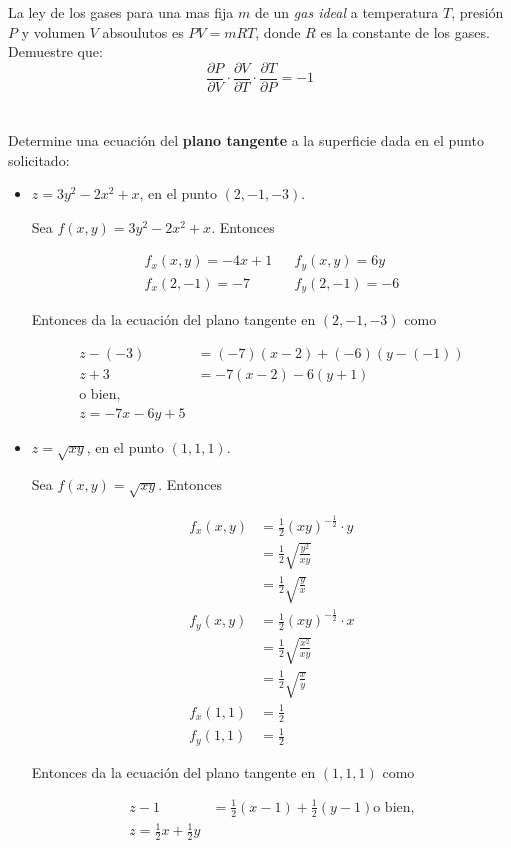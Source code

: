 \documentclass[12pt]{article}
\begin{document}
La ley de los gases para una mas fija $m$ de un \textit{gas ideal} a temperatura $T$, presión $P$ y volumen $V$ absoulutos es $P V = mRT$, donde $R$ es la constante de los gases. Demuestre que:
$$\frac{\partial P}{\partial V} \cdot \frac{\partial V}{\partial T} \cdot \frac{\partial T}{\partial P} = -1$$

\section{}

Determine una ecuación del \textbf{plano tangente} a la superficie dada en el punto solicitado:

\begin{itemize}[format=\textbf]

\item $z=3y^2-2x^2+x$, en el punto $(2,-1,-3)$.

Sea $f(x,y)=3y^2-2x^2+x$. Entonces 

\begin{align*}
f_x(x,y)=-4x+1 
&&
f_y(x,y)=6y \\
f_x(2,-1)=-7
&&
f_y(2,-1)=-6
\end{align*}

Entonces da la ecuación del plano tangente en $(2,-1,-3)$ como

\begin{align*}
z-(-3)&=(-7)(x-2)+(-6)(y-(-1)) \\
z+3&=-7(x-2)-6(y+1) \\
\text{o bien,}\\
z=-7x-6y+5
\end{align*}

\item $z=\sqrt{xy}$, en el punto $(1,1,1)$.

Sea $f(x,y)=\sqrt{xy}$. Entonces 

\begin{align*}
f_x(x,y) &= \frac{1}{2}(xy)^{-\frac{1}{2}} \cdot y \\
&= \frac{1}{2}\sqrt{\frac{y^2}{xy}} \\
&= \frac{1}{2}\sqrt{\frac{y}{x}} \\
f_y(x,y) &= \frac{1}{2}(xy)^{-\frac{1}{2}} \cdot x \\
&= \frac{1}{2}\sqrt{\frac{x^2}{xy}} \\
&= \frac{1}{2}\sqrt{\frac{x}{y}} \\
f_x(1,1) &= \frac{1}{2} \\
f_y(1,1) &= \frac{1}{2}
\end{align*}

Entonces da la ecuación del plano tangente en $(1,1,1)$ como

\begin{align*}
z-1 &= \frac{1}{2}(x-1) + \frac{1}{2}(y-1)
\text{o bien,}\\
z= \frac{1}{2}x + \frac{1}{2}y
\end{align*}

\end{itemize}
\end{document}
